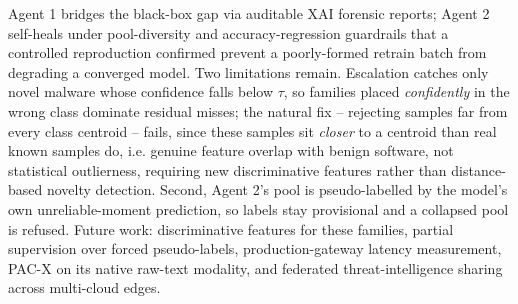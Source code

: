 \documentclass[conference]{IEEEtran}
\begin{document}
Agent 1 bridges the black-box gap via auditable XAI forensic reports; Agent 2 self-heals under pool-diversity and accuracy-regression guardrails that a controlled reproduction confirmed prevent a poorly-formed retrain batch from degrading a converged model. Two limitations remain. Escalation catches only novel malware whose confidence falls below $\tau$, so families placed \emph{confidently} in the wrong class dominate residual misses; the natural fix -- rejecting samples far from every class centroid -- fails, since these samples sit \emph{closer} to a centroid than real known samples do, i.e. genuine feature overlap with benign software, not statistical outlierness, requiring new discriminative features rather than distance-based novelty detection. Second, Agent 2's pool is pseudo-labelled by the model's own unreliable-moment prediction, so labels stay provisional and a collapsed pool is refused. Future work: discriminative features for these families, partial supervision over forced pseudo-labels, production-gateway latency measurement, PAC-X on its native raw-text modality, and federated threat-intelligence sharing across multi-cloud edges.
\end{document}
